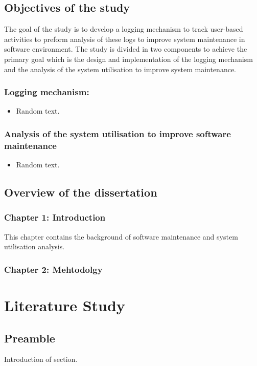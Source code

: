 \subsection{Objectives of the study}
The goal of the study is to develop a logging mechanism to track user-based
activities to preform analysis of these logs to improve system maintenance in
software environment. The study is divided in two components to achieve the
primary goal which is the design and implementation of the logging mechanism
and the analysis of the system utilisation to improve system maintenance.

\subsubsection{Logging mechanism:}
\begin{itemize}
    \item Random text.
\end{itemize}

\subsubsection{Analysis of the system utilisation to improve software maintenance}
\begin{itemize}
    \item Random text.
\end{itemize}

\subsection{Overview of the dissertation}
\subsubsection{Chapter 1: Introduction}
This chapter contains the background of software maintenance and system
utilisation analysis.
\subsubsection{Chapter 2: Mehtodolgy}

\newpage
\section{Literature Study}

\subsection{Preamble}
Introduction of section.

